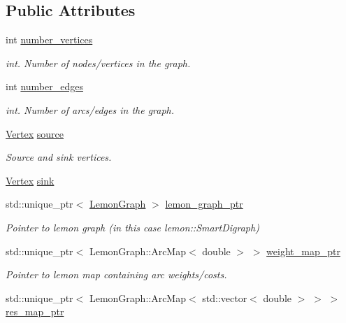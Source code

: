 \subsection*{Public Attributes}
\begin{DoxyCompactItemize}
\item 
int \hyperlink{classbidirectional_1_1DiGraph_a55a3ad47c4958000a7b68e0afd566d4f}{number\+\_\+vertices}
\begin{DoxyCompactList}\small\item\em int. Number of nodes/vertices in the graph. \end{DoxyCompactList}\item 
int \hyperlink{classbidirectional_1_1DiGraph_a8c53e94a9b9e41a50e0f3ecf348d1b87}{number\+\_\+edges}
\begin{DoxyCompactList}\small\item\em int. Number of arcs/edges in the graph. \end{DoxyCompactList}\item 
\hyperlink{structbidirectional_1_1Vertex}{Vertex} \hyperlink{classbidirectional_1_1DiGraph_a8a790a14fd031fbe7a95fefe5f01fa0c}{source}
\begin{DoxyCompactList}\small\item\em Source and sink vertices. \end{DoxyCompactList}\item 
\hyperlink{structbidirectional_1_1Vertex}{Vertex} \hyperlink{classbidirectional_1_1DiGraph_a11aab634efaff2bdbdbd77436d799206}{sink}
\item 
std\+::unique\+\_\+ptr$<$ \hyperlink{digraph_8h_a537ef8dbf2625a2629b10f4121e6db2b}{Lemon\+Graph} $>$ \hyperlink{classbidirectional_1_1DiGraph_a8acd5e0889d880b5b98d1c67a356c4e2}{lemon\+\_\+graph\+\_\+ptr}
\begin{DoxyCompactList}\small\item\em Pointer to lemon graph (in this case lemon\+::\+Smart\+Digraph) \end{DoxyCompactList}\item 
std\+::unique\+\_\+ptr$<$ Lemon\+Graph\+::\+Arc\+Map$<$ double $>$ $>$ \hyperlink{classbidirectional_1_1DiGraph_a19b9b7f89e09c77cfeb5ce3a19f2e677}{weight\+\_\+map\+\_\+ptr}
\begin{DoxyCompactList}\small\item\em Pointer to lemon map containing arc weights/costs. \end{DoxyCompactList}\item 
std\+::unique\+\_\+ptr$<$ Lemon\+Graph\+::\+Arc\+Map$<$ std\+::vector$<$ double $>$ $>$ $>$ \hyperlink{classbidirectional_1_1DiGraph_acfed46f3f0adb003d0c90d713c1418cb}{res\+\_\+map\+\_\+ptr}

\end{DoxyCompactItemize}
